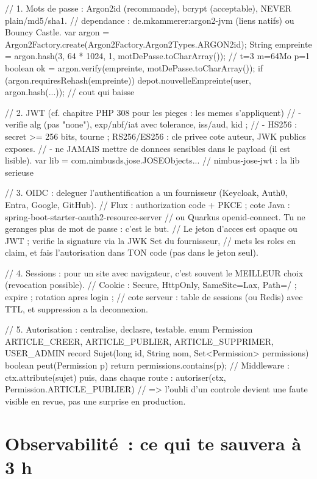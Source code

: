 \begin{codejava}
// 1. Mots de passe : Argon2id (recommande), bcrypt (acceptable), NEVER plain/md5/sha1.
//    dependance : de.mkammerer:argon2-jvm (liens natifs) ou Bouncy Castle.
var argon = Argon2Factory.create(Argon2Factory.Argon2Types.ARGON2id);
String empreinte = argon.hash(3, 64 * 1024, 1, motDePasse.toCharArray());   // t=3 m=64Mo p=1
boolean ok = argon.verify(empreinte, motDePasse.toCharArray());
if (argon.requiresRehash(empreinte)) { depot.nouvelleEmpreinte(user, argon.hash(...)); }  // cout qui baisse

// 2. JWT (cf. chapitre PHP 308 pour les pieges : les memes s'appliquent)
//    - verifie alg (pas "none"), exp/nbf/iat avec tolerance, iss/aud, kid ;
//    - HS256 : secret >= 256 bits, tourne ; RS256/ES256 : cle privee cote auteur, JWK publics exposes.
//    - ne JAMAIS mettre de donnees sensibles dans le payload (il est lisible).
var lib = com.nimbusds.jose.JOSEObjects...       // nimbus-jose-jwt : la lib serieuse

// 3. OIDC : deleguer l'authentification a un fournisseur (Keycloak, Auth0, Entra, Google, GitHub).
//    Flux : authorization code + PKCE ; cote Java : spring-boot-starter-oauth2-resource-server
//    ou Quarkus openid-connect. Tu ne geranges plus de mot de passe : c'est le but.
//    Le jeton d'acces est opaque ou JWT ; verifie la signature via la JWK Set du fournisseur,
//    mets les roles en claim, et fais l'autorisation dans TON code (pas dans le jeton seul).

// 4. Sessions : pour un site avec navigateur, c'est souvent le MEILLEUR choix (revocation possible).
//    Cookie : Secure, HttpOnly, SameSite=Lax, Path=/ ; expire ; rotation apres login ;
//    cote serveur : table de sessions (ou Redis) avec TTL, et suppression a la deconnexion.

// 5. Autorisation : centralise, declasre, testable.
enum Permission { ARTICLE_CREER, ARTICLE_PUBLIER, ARTICLE_SUPPRIMER, USER_ADMIN }
record Sujet(long id, String nom, Set<Permission> permissions) {
    boolean peut(Permission p) { return permissions.contains(p); }
}
// Middleware : ctx.attribute(sujet) puis, dans chaque route : autoriser(ctx, Permission.ARTICLE_PUBLIER)
// => l'oubli d'un controle devient une faute visible en revue, pas une surprise en production.
\end{codejava}

\section{Observabilit\'e~: ce qui te sauvera \`a 3 h}

